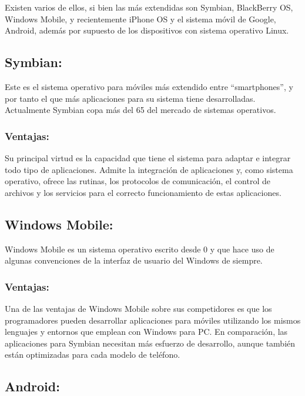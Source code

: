 \documentclass{bmcart}
\begin{document}
Existen varios de ellos, si bien las más extendidas son Symbian, BlackBerry
OS, Windows Mobile, y recientemente iPhone OS y el sistema móvil de Google,
Android, además por supuesto de los dispositivos con sistema operativo Linux.\cite{alonsodispositivos}\cite{del2009sistemas}

\subsection*{Symbian:}

Este es el sistema operativo para móviles más extendido entre “smartphones”, y por
tanto el que más aplicaciones para su sistema tiene desarrolladas. Actualmente
Symbian copa más del 65 del mercado de sistemas operativos.\cite{del2009sistemas}

\subsubsection*{Ventajas:}

Su principal virtud es la capacidad que tiene el sistema para adaptar e integrar todo
tipo de aplicaciones. Admite la integración de aplicaciones y, como sistema operativo,
ofrece las rutinas, los protocolos de comunicación, el control de archivos y los
servicios para el correcto funcionamiento de estas aplicaciones.

\subsection*{Windows Mobile:}

Windows Mobile es un sistema operativo escrito desde 0 y que hace uso de
algunas convenciones de la interfaz de usuario del Windows de siempre.\cite{del2009sistemas}

\subsubsection*{Ventajas:}

Una de las ventajas de Windows Mobile sobre sus competidores es que los
programadores pueden desarrollar aplicaciones para móviles utilizando los mismos
lenguajes y entornos que emplean con Windows para PC. En comparación, las
aplicaciones para Symbian necesitan más esfuerzo de desarrollo, aunque también
están optimizadas para cada modelo de teléfono.


\subsection*{Android:}
\end{document}
